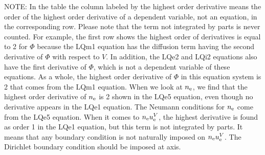 \documentclass[11pt]{article}
\def\r#1{{\rm#1}}
\def\nee{n_\r{e}}
\def\uV#1{u_\r{#1}^V}
\begin{document}
NOTE: In the table the column labeled by the highest order derivative means
the order of the highest order derivative of a dependent variable, not
an equation, in the corresponding row.
Please note that the term not integrated by parts is never counted.
For example, the first row shows the highest order of derivatives is
equal to 2 for $\Phi$ because the LQm1 equation
has the diffusion term having the second derivative of $\Phi$ with
respect to $V$. In addition, the LQe2 and LQi2 equations also have the
first derivative of $\Phi$, which is not a dependent variable of these
equations. As a whole, the highest order derivative of $\Phi$ in this
equation system is 2 that comes from the LQm1 equation.
When we look at $\nee$, we find that the highest order derivative of
$\nee$ is 2 shown in the LQe5 equation, even though no derivative
appears in the LQe1 equation. The Neumann conditions for $\nee$ come
from the LQe5 equation.
When it comes to $\nee\uV{e}$, the highest derivative is found as order 1
in the LQe1 equation, but this term is not integrated by parts.
It means that any boundary condition is not naturally imposed on
$\nee\uV{e}$. The Dirichlet boundary condition should be imposed at axis.
\end{document}
